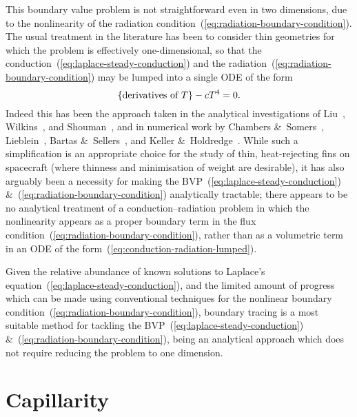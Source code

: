 This boundary value problem is not straightforward
even in two dimensions,
due to the nonlinearity of
the radiation condition~(\ref{eq:radiation-boundary-condition}).
The usual treatment in the literature has been to consider thin geometries
for which the problem is effectively one-dimensional,
so that the conduction~(\ref{eq:laplace-steady-conduction})
and the radiation~(\ref{eq:radiation-boundary-condition})
may be lumped into a single ODE of the form
\begin{equation}
  \left\{\textnormal{derivatives of~$T$}\right\} - c T^4 = 0.
  \label{eq:conduction-radiation-lumped}
\end{equation}
Indeed this has been the approach taken in the analytical investigations of
Liu~\cite{liu-1960-minimum-rectangular-radiating-fins},
Wilkins~\cite{
  wilkins-1960-minumum-mass-fins-radiation,
  wilkins-1961-minimum-mass-fins-thickness,
  wilkins-1962-minimum-mass-fins-gradients,
  wilkins-1974-optimum-shapes-convection-radiation
},
and
Shouman~\cite{shouman-1968-exact-radiation-convection-fin},
and in numerical work by
Chambers \&~Somers~\cite{chambers-1959-radiation-fin-efficiency-circular},
Lieblein~\cite{lieblein-1959-radiant-fin-constant-thickness},
Bartas \&~Sellers~\cite{bartas-1960-radiation-fin-effectiveness},
and
Keller \&~Holdredge~\cite{keller-1970-radiation-annular-fins-trapezoidal}.
While such a simplification is an appropriate choice
for the study of thin, heat-rejecting fins on spacecraft
(where thinness and minimisation of weight are desirable),
it has also arguably been a necessity
for making the BVP~(\ref{eq:laplace-steady-conduction})
\&~(\ref{eq:radiation-boundary-condition}) analytically tractable;
there appears to be no analytical treatment
of a conduction--radiation problem
in which the nonlinearity appears as a proper boundary term
in the flux condition~(\ref{eq:radiation-boundary-condition}),
rather than as a volumetric term in an ODE
of the form~(\ref{eq:conduction-radiation-lumped}).

Given the relative abundance of known solutions
to Laplace's equation~(\ref{eq:laplace-steady-conduction}),
and the limited amount of progress which can be made
using conventional techniques
for the nonlinear boundary condition~(\ref{eq:radiation-boundary-condition}),
boundary tracing is a most suitable method
for tackling the BVP~(\ref{eq:laplace-steady-conduction})
\&~(\ref{eq:radiation-boundary-condition}),
being an analytical approach
which does not require reducing the problem to one dimension.

\section{Capillarity}
\label{sec:introduction.capillarity}

